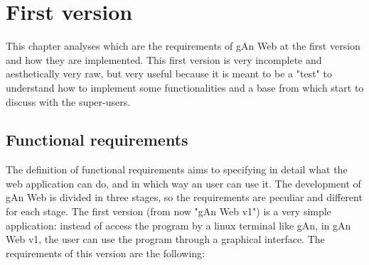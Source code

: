 
\chapter{First version} %

\label{Chapter4} %


This chapter analyses which are the requirements of gAn Web at the first version and how they are implemented. This first version is very incomplete and aesthetically very raw, but very useful because it is meant to be a "test" to understand how to implement some functionalities and a base from which start to discuss with the super-users. 

\section{Functional requirements}
The definition of functional requirements aims to specifying in detail what the web application can do, and in which way an user can use it. The development of gAn Web is divided in three stages, so the requirements are peculiar and different for each stage. The first version (from now "gAn Web v1") is a very simple application: instead of access the program by a linux terminal like gAn, in gAn Web v1, the user can use the program through a graphical interface. 
The requirements of this version are the following:

